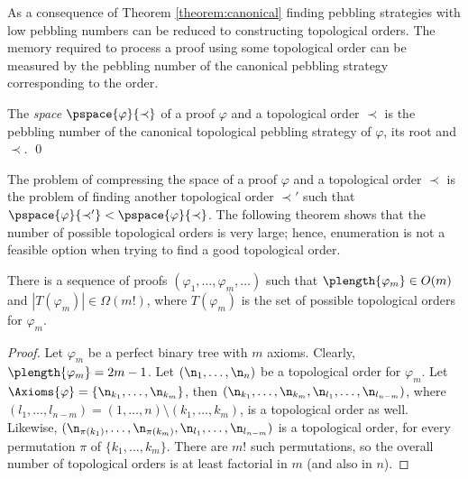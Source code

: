 As a consequence of Theorem \ref{theorem:canonical} finding pebbling strategies with low pebbling numbers can be reduced to constructing topological orders.
The memory required to process a proof using some topological order can be measured by the pebbling number of the canonical pebbling strategy corresponding to the order.

\begin{definition}[Space]
\label{def:space measure}
The \emph{space} $\pspace{\varphi}{\prec}$ 
of a proof $\varphi$ and a topological order $\prec$ is the pebbling number of the canonical topological pebbling strategy of $\varphi$, its root and $\prec$.
\qed
\end{definition}

The problem of compressing the space of a proof $\varphi$ and a topological order $\prec$ is the problem of finding another topological order $\prec'$ such that $\pspace{\varphi}{\prec'} < \pspace{\varphi}{\prec}$. The following theorem shows that the number of possible topological orders is very large; hence, enumeration is not a feasible option when trying to find a good topological order.

\begin{theorem}
\label{theorem:enumeration}
There is a sequence of proofs $(\varphi_1,\ldots,\varphi_m,\ldots)$ such that $\plength{\varphi_m} \in O(m)$ and $|T(\varphi_m)| \in \Omega(m!)$, where $T(\varphi_m)$ is the set of possible topological orders for $\varphi_m$.
\end{theorem}
\begin{proof}
Let $\varphi_m$ be a perfect binary tree with $m$ axioms. Clearly, $\plength{\varphi_m} = 2m-1$.
Let $(\n_1,\ldots,\n_n)$ be a topological order for $\varphi_m$. 
Let $\Axioms{\varphi} = \{\n_{k_1},\ldots,\n_{k_m}\}$, then $(\n_{k_1},\ldots,\n_{k_m},\n_{l_1},\ldots,\n_{l_{n-m}})$, where $(l_1,\ldots,l_{n-m}) = (1,\ldots,n) \setminus (k_1,\ldots,k_m)$, is a topological order as well. 
Likewise, $(\n_{\pi({k_1})},\ldots,\n_{\pi({k_m})},\n_{l_1},\ldots,\n_{l_{n-m}})$ is a topological order, for every permutation $\pi$ of $\{k_1,\ldots,k_m\}$. There are $m!$ such permutations, so the overall number of topological orders is at least factorial in $m$ (and also in $n$).
\end{proof}

